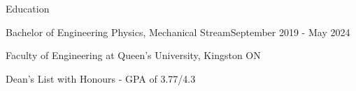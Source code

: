 \documentclass{resume} %
\begin{document}
\begin{rSection}{Education}

  \begin{rSubsection}{Bachelor of Engineering Physics, Mechanical Stream}{September 2019 - May 2024}{}{}{}
    \item Faculty of Engineering at Queen's University, Kingston ON
    \item Dean's List with Honours - GPA of 3.77/4.3
    \begin{comment}
    \\
    \begin{tabular}{ @{} >{\bfseries}l @{\hspace{3ex}}p{6.2in} }
    Thesis Topic & Modelling a Relativistic Spacecraft Mission to
    Detect a Distant Primordial Black Hole
    Orbiting Our Sun \\
    Extracurriculars & Queen's Brazilian Jiujitsu Executive, Queen's Rocket Engineering Team, Head of OTIS '21, EngLinks Physics Tutor, \\
    \end{tabular}
  \end{comment}
  \end{rSubsection}
  
  \end{rSection}

\end{document}
